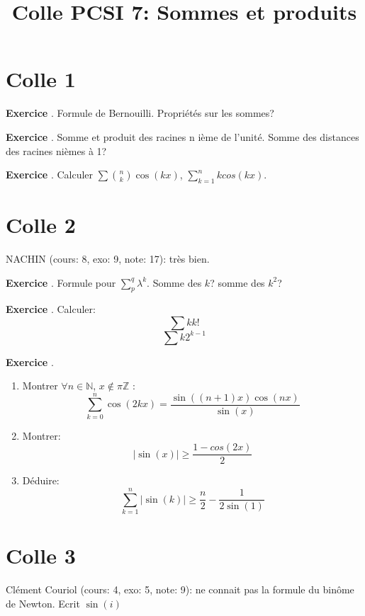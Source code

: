 \documentclass[10pt,a4paper]{article}
\title{Colle PCSI 7: Sommes et produits}
\newcounter{question}
\newcounter{exo}
\newenvironment{exo}{\vspace{0.5cm}\setcounter{question}{0}\addtocounter{exo}{1} \noindent \textbf{Exercice \theexo}. \normalsize }{\par}
\begin{document}
	\maketitle

	\section*{Colle 1}
	
	\begin{exo}
		Formule de Bernouilli. Propriétés sur les sommes?
	\end{exo}
	
	\begin{exo}
		Somme et produit des racines n ième de l'unité. Somme des distances des racines nièmes à 1?
	\end{exo}

	\begin{exo}
		Calculer $\sum \binom{n}{k} \cos(kx)$, $\sum_{k=1}^{n} k cos(k x)$.
	\end{exo}	
	
	\section*{Colle 2}
	\setcounter{exo}{0}
	NACHIN (cours: 8, exo: 9, note: 17): très bien.
	
	\begin{exo}
		Formule pour $\sum_p^q \lambda^k$. Somme des $k$? somme des $k^2$?
	\end{exo}
	
	\begin{exo}
		Calculer:
		$$\sum k k!$$ $$\sum k 2^{k-1}$$
	\end{exo}
	\begin{exo}
		\begin{enumerate}
			\item Montrer $\forall n \in \mathbb{N}$, $x \notin \pi \mathbb{Z}$ :
			$$\sum_{k=0}^{n} \cos(2kx) = \frac{\sin((n+1)x) \cos(nx)}{\sin(x)}$$
			\item Montrer:
			$$\vert \sin(x) \vert \geq \frac{1 - cos(2x)}{2}$$
			\item Déduire:
			$$\sum_{k=1}^{n} \vert \sin(k) \vert \geq \frac{n}{2}  - \frac{1}{2 \sin(1)}$$
		\end{enumerate}
	\end{exo}
	
	\section*{Colle 3}
	\setcounter{exo}{0}
	Clément Couriol (cours: 4, exo: 5, note: 9): ne connait pas la formule du binôme de Newton. Ecrit $\sin(i)$ \\
	
\end{document}
